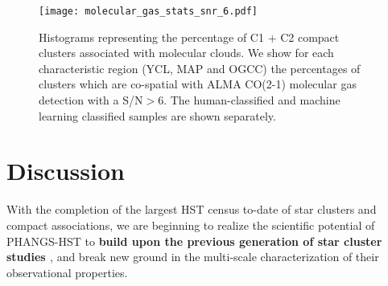 \documentclass[linenumbers]{aastex63}
\begin{document}









%

%
%
\begin{figure} 
\texttt{[image: molecular\_gas\_stats\_snr\_6.pdf]}
\caption{Histograms representing the percentage of C1 + C2 compact clusters associated with molecular clouds. We show for each characteristic region (YCL, MAP and OGCC) the percentages of clusters which are co-spatial with ALMA CO(2-1) molecular gas detection with a S/N$>6$. The human-classified and machine learning classified samples are shown separately.}
 \label{fig:dist_gmc}
\end{figure}
%
\section{Discussion}\label{sect:discussion}

With the completion of the largest HST census to-date of star clusters and compact associations, we are beginning to realize the scientific potential of PHANGS-HST to \textbf{build upon the previous generation of star cluster studies \citep[e.g.,][and references therein]{portegies_zwart_young_2010, renaud_star_2018, krumholz_star_2019, adamo20}}, and break new ground in the multi-scale characterization of their observational properties.  
\end{document}
